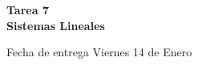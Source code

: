\documentclass[12pt]{exam}
\begin{document}
\centering


\Large 
\textbf{\huge Tarea 7 \\ \large Sistemas Lineales}

\small
Fecha de entrega Viernes 14 de Enero
\vskip10pt

\normalsize

\pointformat{\bfseries\boldmath(\thepoints)}
\vskip10pt
\end{document}
